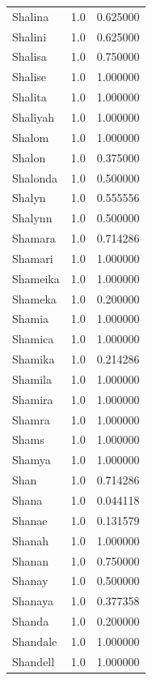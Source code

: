 \documentclass[
  letterpaper,
  DIV=11,
  numbers=noendperiod]{scrreprt}
\begin{document}
\begin{tabular}{lrr}
Shalina         &   1.0 &   0.625000 \\
Shalini         &   1.0 &   0.625000 \\
Shalisa         &   1.0 &   0.750000 \\
Shalise         &   1.0 &   1.000000 \\
Shalita         &   1.0 &   1.000000 \\
Shaliyah        &   1.0 &   1.000000 \\
Shalom          &   1.0 &   1.000000 \\
Shalon          &   1.0 &   0.375000 \\
Shalonda        &   1.0 &   0.500000 \\
Shalyn          &   1.0 &   0.555556 \\
Shalynn         &   1.0 &   0.500000 \\
Shamara         &   1.0 &   0.714286 \\
Shamari         &   1.0 &   1.000000 \\
Shameika        &   1.0 &   1.000000 \\
Shameka         &   1.0 &   0.200000 \\
Shamia          &   1.0 &   1.000000 \\
Shamica         &   1.0 &   1.000000 \\
Shamika         &   1.0 &   0.214286 \\
Shamila         &   1.0 &   1.000000 \\
Shamira         &   1.0 &   1.000000 \\
Shamra          &   1.0 &   1.000000 \\
Shams           &   1.0 &   1.000000 \\
Shamya          &   1.0 &   1.000000 \\
Shan            &   1.0 &   0.714286 \\
Shana           &   1.0 &   0.044118 \\
Shanae          &   1.0 &   0.131579 \\
Shanah          &   1.0 &   1.000000 \\
Shanan          &   1.0 &   0.750000 \\
Shanay          &   1.0 &   0.500000 \\
Shanaya         &   1.0 &   0.377358 \\
Shanda          &   1.0 &   0.200000 \\
Shandale        &   1.0 &   1.000000 \\
Shandell        &   1.0 &   1.000000 \\

\end{tabular}
\end{document}
